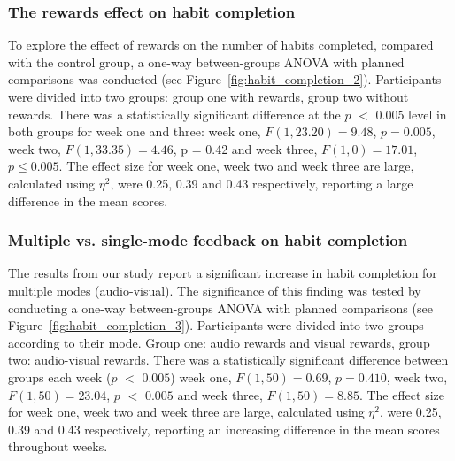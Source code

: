 \documentclass{scaffold/sigchi}
\begin{document}
\subsubsection{The rewards effect on habit completion}
To explore the effect of rewards on the number of habits completed, compared with the control group, a one-way between-groups ANOVA with planned comparisons was conducted (see Figure~\ref{fig:habit_completion_2}). Participants were divided into two groups: group one with rewards, group two without rewards. There was a statistically significant difference at the $p$ $<$ $0.005$ level in both groups for week one and three: week one, $F(1,23.20) = 9.48$, $p = 0.005$, week two, $F(1,33.35) = 4.46$, p = 0.42 and week three, $F(1,0) = 17.01$, $p\leq 0.005$. The effect size for week one, week two and week three are large, calculated using $\eta^{2}$, were 0.25, 0.39 and 0.43 respectively, reporting a large difference in the mean scores.


\subsubsection{Multiple vs. single-mode feedback on habit completion}
The results from our study report a significant increase in habit completion for multiple modes (audio-visual). The significance of this finding was tested by conducting a one-way between-groups ANOVA with planned comparisons (see Figure~\ref{fig:habit_completion_3}). Participants were divided into two groups according to their mode. Group one: audio rewards and visual rewards, group two: audio-visual rewards. There was a statistically significant difference between groups each week ($p$ $<$ $0.005$) week one, $F(1,50) = 0.69$, $p = 0.410$, week two, $F(1,50) = 23.04$, $p$ $<$ $0.005$ and week three, $F(1,50) = 8.85$. The effect size for week one, week two and week three are large, calculated using $\eta^{2}$, were 0.25, 0.39 and 0.43 respectively, reporting an increasing difference in the mean scores throughout weeks.
\end{document}
